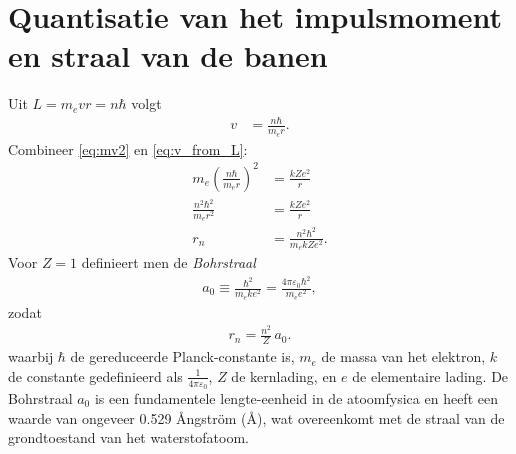 \documentclass{report} %
\begin{document}
    \section{Quantisatie van het impulsmoment en straal van de banen}
    Uit $L=m_e v r = n\hbar$ volgt
    \begin{align}
        v &= \frac{n\hbar}{m_e r}.
        \label{eq:v_from_L}
    \end{align}
    Combineer \eqref{eq:mv2} en \eqref{eq:v_from_L}:
    \begin{align}
        m_e\left(\frac{n\hbar}{m_e r}\right)^2 &= \frac{k Z e^2}{r}
        \\
        \frac{n^2\hbar^2}{m_e r^2} &= \frac{k Z e^2}{r}
        \\
        r_n &= \frac{n^2\hbar^2}{m_e k Z e^2}.
        \label{eq:bohr_radius_general}
    \end{align}
    Voor $Z=1$ definieert men de \emph{Bohrstraal}
    \begin{align}
        a_0 \equiv \frac{\hbar^2}{m_e k e^2} = \frac{4\pi\varepsilon_0\hbar^2}{m_e e^2},
    \end{align}
    zodat
    \begin{align}
        r_n = \frac{n^2}{Z}\,a_0.
    \end{align}
    waarbij $\hbar$ de gereduceerde Planck-constante is,
    $m_e$ de massa van het elektron,
    $k$ de constante gedefinieerd als $\frac{1}{4\pi\varepsilon_0}$, $Z$ de kernlading,
    en $e$ de elementaire lading. De Bohrstraal
    $a_0$ is een fundamentele lengte-eenheid in de atoomfysica en heeft een waarde van ongeveer 0.529 Ångström (Å), wat overeenkomt met de straal van de grondtoestand van het waterstofatoom.
\end{document}
